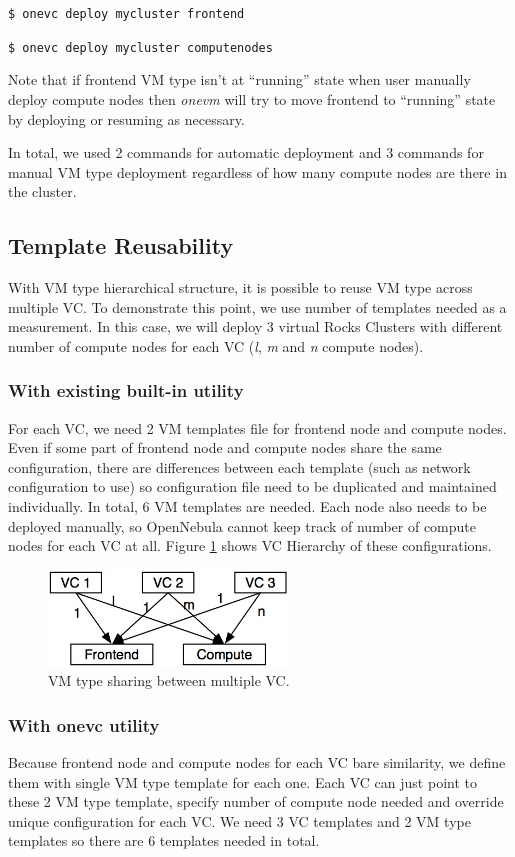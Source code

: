 \documentclass[conference]{IEEEtran}
\begin{document}
\texttt{\$ onevc deploy mycluster frontend}

\texttt{\$ onevc deploy mycluster computenodes}

Note that if frontend VM type isn't at ``running'' state when user manually deploy compute nodes then \emph{onevm} will try to move frontend to ``running'' state by deploying or resuming as necessary.

In total, we used 2 commands for automatic deployment and 3 commands for manual VM type deployment regardless of how many compute nodes are there in the cluster.

\subsection{Template Reusability}
With VM type hierarchical structure, it is possible to reuse VM type across multiple VC.
To demonstrate this point, we use number of templates needed as a measurement.
In this case, we will deploy 3 virtual Rocks Clusters \cite{CPE:CPE722} with different number of compute nodes for each VC (\emph{l}, \emph{m} and \emph{n} compute nodes).

\subsubsection{With existing built-in utility}
For each VC, we need 2 VM templates file for frontend node and compute nodes.
Even if some part of frontend node and compute nodes share the same configuration, there are differences between each template (such as network configuration to use) so configuration file need to be duplicated and maintained individually.
In total, 6 VM templates are needed.
Each node also needs to be deployed manually, so OpenNebula cannot keep track of number of compute nodes for each VC at all.
Figure \ref{fig:vmtypeshare} shows VC Hierarchy of these configurations.

\begin{figure}[!t]
\centering
\includegraphics[width=2.5in]{vmtypeshare}
\caption{VM type sharing between multiple VC.}
\label{fig:vmtypeshare}
\end{figure}

\subsubsection{With onevc utility}
Because frontend node and compute nodes for each VC bare similarity, we define them with single VM type template for each one.
Each VC can just point to these 2 VM type template, specify number of compute node needed and override unique configuration for each VC.
We need 3 VC templates and 2 VM type templates so there are 6 templates needed in total.
\end{document}
